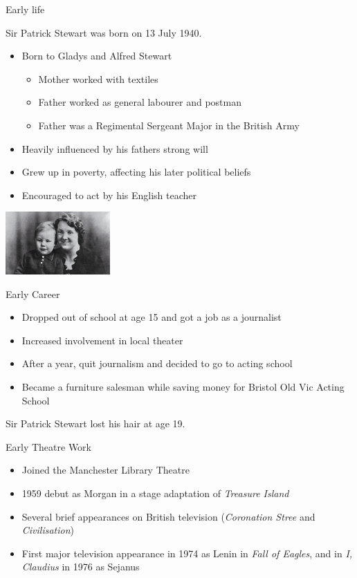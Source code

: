 \documentclass[xcolor=dvipsnames]{beamer}
\begin{document}
\begin{frame}{Early life}
  \begin{fct}
    Sir Patrick Stewart was born on 13 July 1940.
  \end{fct}
  \begin{itemize}
    \item Born to Gladys and Alfred Stewart
    \begin{itemize}
      \item Mother worked with textiles
      \item Father worked as general labourer and postman
      \item Father was a Regimental Sergeant Major in the British Army
    \end{itemize}
    \item Heavily influenced by his fathers strong will
    \item Grew up in poverty, affecting his later political beliefs
    \item Encouraged to act by his English teacher
  \end{itemize}
  \begin{center}
    \includegraphics[width=0.3\textwidth]{kid.jpg}
  \end{center}
\end{frame}

\begin{frame}{Early Career}
  \begin{itemize}
    \item Dropped out of school at age 15 and got a job as a journalist
    \item Increased involvement in local theater
    \item After a year, quit journalism and decided to go to acting school
    \item Became a furniture salesman while saving money for Bristol Old Vic
    Acting School
  \end{itemize}
  \begin{fct}
    Sir Patrick Stewart lost his hair at age 19.
  \end{fct}
\end{frame}

\begin{frame}{Early Theatre Work}
  \begin{itemize}
    \item Joined the Manchester Library Theatre
    \item 1959 debut as Morgan in a stage adaptation of \emph{Treasure Island}
    \item Several brief appearances on British television (\emph{Coronation
    Stree} and \emph{Civilisation})
    \item First major television appearance in 1974 as Lenin in \emph{Fall of
    Eagles}, and in \emph{I, Claudius} in 1976 as Sejanus
  \end{itemize}
\end{frame}
\end{document}
